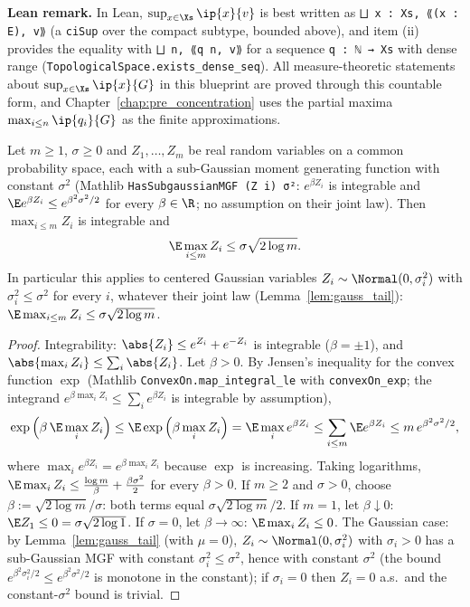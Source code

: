 \textbf{Lean remark.} In Lean, $\sup_{x\in\Xs}\ip{x}{v}$ is best written as
\texttt{⨆ x : Xs, ⟪(x : E), v⟫} (a \texttt{ciSup} over the compact subtype, bounded above),
and item (ii) provides the equality with \texttt{⨆ n, ⟪q n, v⟫} for a sequence
\texttt{q : ℕ → Xs} with dense range (\texttt{TopologicalSpace.exists\_dense\_seq}). All
measure-theoretic statements about $\sup_{x\in\Xs}\ip{x}{G}$ in this blueprint are proved
through this countable form, and Chapter~\ref{chap:pre_concentration} uses the partial maxima
$\max_{i\le n}\ip{q_i}{G}$ as the finite approximations.

\begin{lemma}\label{lem:gauss_max_upper}
\leanok
{}
Let $m \ge 1$, $\sigma \ge 0$ and $Z_1,\dots,Z_m$ be real random variables on a common
probability space, each with a sub-Gaussian moment generating function with constant
$\sigma^2$ (Mathlib \texttt{HasSubgaussianMGF (Z i) σ²}: $e^{\beta Z_i}$ is integrable and
$\E e^{\beta Z_i}\le e^{\beta^2\sigma^2/2}$ for every $\beta\in\R$; no assumption on their
joint law). Then $\max_{i\le m}Z_i$ is integrable and
\[
  \E\max_{i\le m}Z_i \le \sigma\sqrt{2\log m}.
\]
In particular this applies to centered Gaussian variables $Z_i \sim \Normal(0,\sigma_i^2)$
with $\sigma_i^2 \le \sigma^2$ for every $i$, whatever their joint law
(Lemma~\ref{lem:gauss_tail}): $\E\max_{i\le m}Z_i \le \sigma\sqrt{2\log m}$.
\end{lemma}

\begin{proof}
\leanok
{}
Integrability: $\abs{Z_i}\le e^{Z_i} + e^{-Z_i}$ is integrable ($\beta = \pm1$), and
$\abs{\max_iZ_i} \le \sum_i\abs{Z_i}$. Let $\beta > 0$. By Jensen's inequality for the convex
function $\exp$ (Mathlib \texttt{ConvexOn.map\_integral\_le} with \texttt{convexOn\_exp}; the
integrand $e^{\beta\max_iZ_i} \le \sum_ie^{\beta Z_i}$ is integrable by assumption),
\[
  \exp\Big(\beta\,\E\max_iZ_i\Big) \le \E\exp\Big(\beta\max_iZ_i\Big)
  = \E\max_i e^{\beta Z_i} \le \sum_{i\le m}\E e^{\beta Z_i}
  \le m\,e^{\beta^2\sigma^2/2},
\]
where $\max_ie^{\beta Z_i} = e^{\beta\max_iZ_i}$ because $\exp$ is increasing. Taking
logarithms, $\E\max_iZ_i \le \frac{\log m}{\beta} + \frac{\beta\sigma^2}{2}$ for every
$\beta>0$. If $m\ge2$ and $\sigma>0$, choose $\beta := \sqrt{2\log m}/\sigma$: both terms
equal $\sigma\sqrt{2\log m}/2$. If $m = 1$, let $\beta\downarrow0$: $\E Z_1\le0 = \sigma\sqrt{2\log1}$.
If $\sigma = 0$, let $\beta\to\infty$: $\E\max_iZ_i\le0$. The Gaussian case: by
Lemma~\ref{lem:gauss_tail} (with $\mu = 0$), $Z_i\sim\Normal(0,\sigma_i^2)$ with $\sigma_i>0$
has a sub-Gaussian MGF with constant $\sigma_i^2\le\sigma^2$, hence with constant $\sigma^2$
(the bound $e^{\beta^2\sigma_i^2/2}\le e^{\beta^2\sigma^2/2}$ is monotone in the constant);
if $\sigma_i = 0$ then $Z_i = 0$ a.s.\ and the constant-$\sigma^2$ bound is trivial.
\end{proof}

